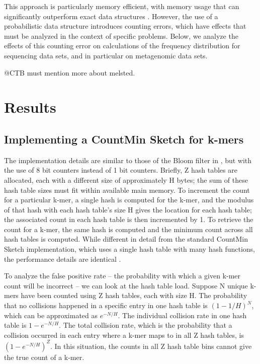 \documentclass{article}
\begin{document}
This approach is particularly memory efficient, with memory usage that
can significantly outperform exact data structures \cite{pellpnas,
  ConwayBromage}.  However, the use of a probabilistic data structure
introduces counting errors, which have effects that must be analyzed
in the context of specific problems.  Below, we analyze the effects of
this counting error on calculations of the frequency distribution for
sequencing data sets, and in particular on metagenomic data sets.

@CTB must mention more about melsted.

\section{Results}

\subsection{Implementing a CountMin Sketch for k-mers}

The implementation details are similar to those of the Bloom filter in
\cite{pellpnas}, but with the use of 8 bit counters instead of 1 bit
counters.  Briefly, Z hash tables are allocated, each with a different
size of approximately H bytes; the sum of these hash table sizes must
fit within available main memory.  To increment the count for a
particular k-mer, a single hash is computed for the k-mer, and the
modulus of that hash with each hash table's size H gives the location
for each hash table; the associated count in each hash table is then
incremented by 1.  To retrieve the count for a k-mer, the same hash is
computed and the minimum count across all hash tables is computed.
While different in detail from the standard CountMin Sketch
implementation, which uses a single hash table with many hash
functions, the performance details are identical \cite{pellpnas}.

To analyze the false positive rate -- the probability with which a
given k-mer count will be incorrect -- we can look at the hash table
load. Suppose N unique k-mers have been counted using Z hash tables,
each with size H.  The probability that no collisions happened in a
specific entry in one hash table is $(1-1/H)^{N}$, which can be
approximated as $e^{-N/H}$. The individual collision rate in one hash
table is $1-e^{-N/H}$. The total collision rate, which is the
probability that a collision occurred in each entry where a k-mer maps
to in all Z hash tables, is $(1-e^{-N/H})^{Z}$. In this situation, the
counts in all Z hash table bins cannot give the true count of a k-mer.
\end{document}
